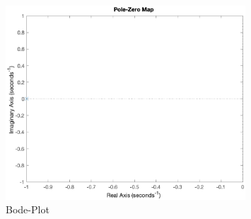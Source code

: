 \begin{figure}[H]
    \label{fig:poleZero}
    \centering
    \includegraphics[width=0.8\textwidth]{Bilder/PoleZeroPT1Tt.eps}
    \caption{Bode-Plot}
 \end{figure}

